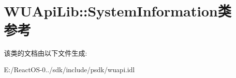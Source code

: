 \hypertarget{class_w_u_api_lib_1_1_system_information}{}\section{W\+U\+Api\+Lib\+:\+:System\+Information类 参考}
\label{class_w_u_api_lib_1_1_system_information}


该类的文档由以下文件生成\+:\begin{DoxyCompactItemize}
\item 
E\+:/\+React\+O\+S-\/0../sdk/include/psdk/wuapi.\+idl\end{DoxyCompactItemize}
